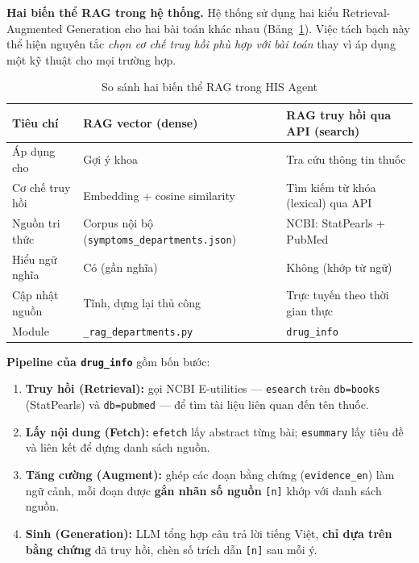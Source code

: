 \documentclass[a4paper,13pt,3p,oneside]{report}
\theoremstyle{definition}
\theoremstyle{remark}
\theoremstyle{definition}
\begin{document}
\textbf{Hai biến thể RAG trong hệ thống.} Hệ thống sử dụng hai kiểu Retrieval-Augmented Generation cho hai bài toán khác nhau (Bảng~\ref{tab:rag-compare}). Việc tách bạch này thể hiện nguyên tắc \textit{chọn cơ chế truy hồi phù hợp với bài toán} thay vì áp dụng một kỹ thuật cho mọi trường hợp.

\begin{table}[H]
\centering
\begin{tabular}{|p{3.2cm}|p{5.0cm}|p{5.0cm}|}
\hline
\textbf{Tiêu chí} & \textbf{RAG vector (dense)} & \textbf{RAG truy hồi qua API (search)} \\
\hline
Áp dụng cho & Gợi ý khoa & Tra cứu thông tin thuốc \\
\hline
Cơ chế truy hồi & Embedding + cosine similarity & Tìm kiếm từ khóa (lexical) qua API \\
\hline
Nguồn tri thức & Corpus nội bộ (\texttt{symptoms\_departments.json}) & NCBI: StatPearls + PubMed \\
\hline
Hiểu ngữ nghĩa & Có (gần nghĩa) & Không (khớp từ ngữ) \\
\hline
Cập nhật nguồn & Tĩnh, dựng lại thủ công & Trực tuyến theo thời gian thực \\
\hline
Module & \texttt{\_rag\_departments.py} & \texttt{drug\_info} \\
\hline
\end{tabular}
\caption{So sánh hai biến thể RAG trong HIS Agent}
\label{tab:rag-compare}
\end{table}

\textbf{Pipeline của \texttt{drug\_info}} gồm bốn bước:
\begin{enumerate}
  \item \textbf{Truy hồi (Retrieval):} gọi NCBI E-utilities --- \texttt{esearch} trên \texttt{db=books} (StatPearls) và \texttt{db=pubmed} --- để tìm tài liệu liên quan đến tên thuốc.
  \item \textbf{Lấy nội dung (Fetch):} \texttt{efetch} lấy abstract từng bài; \texttt{esummary} lấy tiêu đề và liên kết để dựng danh sách nguồn.
  \item \textbf{Tăng cường (Augment):} ghép các đoạn bằng chứng (\texttt{evidence\_en}) làm ngữ cảnh, mỗi đoạn được \textbf{gắn nhãn số nguồn} \texttt{[n]} khớp với danh sách nguồn.
  \item \textbf{Sinh (Generation):} LLM tổng hợp câu trả lời tiếng Việt, \textbf{chỉ dựa trên bằng chứng} đã truy hồi, chèn số trích dẫn \texttt{[n]} sau mỗi ý.
\end{enumerate}
\end{document}
